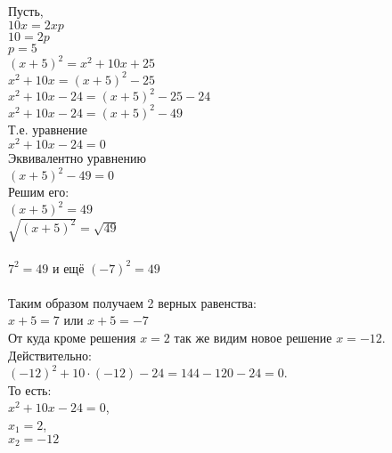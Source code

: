 Пусть,\\
$ 10x = 2xp $ \\
$ 10 = 2p   $ \\
$ p = 5     $ \\
$ \left( x + 5 \right)^2 = x^2 + 10x + 25 $ \\
$ x^2 + 10x = \left( x + 5 \right)^2 - 25 $ \\
$ x^2 + 10x - 24 = \left( x + 5 \right)^2 - 25 - 24$ \\
$ x^2 + 10x - 24 = \left( x + 5 \right)^2 - 49$ \\
Т.е. уравнение \\
$ x^2 + 10x - 24 = 0 $ \\
Эквивалентно уравнению \\
$ \left( x + 5 \right)^2 - 49 = 0 $ \\
Решим его: \\
$ \left( x + 5 \right)^2 = 49 $ \\
$ \sqrt{\left( x + 5 \right)^2} = \sqrt{49} $ \\
\\
$ 7^2 = 49$ и ещё $ (-7)^2 = 49 $ \\
\\
Таким образом получаем 2 верных равенства: \\
$x + 5 = 7$ \qquad или \qquad $x + 5 = -7$ \\
От куда кроме решения $x=2$ так же видим новое решение $x=-12$. Действительно:\\
$(-12)^2 + 10 \cdot (-12) - 24 = 144 - 120 -24 = 0$.\\
То есть: \\
$ x^2 + 10x - 24 = 0 $, \\
$ x_1 = 2 $, \\
$ x_2 = -12 $

